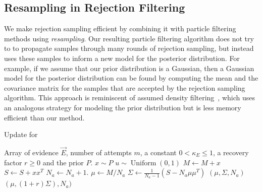 \documentclass[twoside]{article}
\newcommand{\CRej}{\text{rejection filtering}}
\begin{document}

\subsection{Resampling in Rejection Filtering}

We make rejection sampling efficient by combining it with particle
filtering methods using \emph{resampling}.
Our resulting particle filtering algorithm does not try to
to propagate samples through many rounds of rejection sampling, but instead
uses these samples to inform a new model for the posterior distribution. 
For example, if
we assume that our prior distribution is a Gaussian, then a Gaussian model for the posterior
distribution can be found by computing the mean and the covariance matrix for the samples
that are accepted by the rejection sampling algorithm.  This approach is
reminiscent of assumed density filtering~\cite{minka_expectation_2001}, which uses an analogous strategy
for modeling the prior distribution but is less memory efficient than
our method.

\begin{algorithm}[t!]
    \caption{Update for \CRej}
    \label{alg:crej}
    \begin{algorithmic}
        \Require Array of evidence $\vec{E}$, number of attempts $m$, a constant $0<\kappa_E\le 1$, a recovery factor $r \ge 0$ and the prior $P$.
            \State $x \sim P$
            \State $u \sim \operatorname{Uniform}(0, 1)$
            \State $M \gets M+ x$
            \State $S \gets S+ xx^T$
    \State $N_a \gets N_a +1$.
            \EndIf
    \EndFor
       \State $\mu\gets M/N_a $
       \State $\Sigma \gets \frac{1}{N_a -1}\left(S - N_a \mu\mu^T \right)$
    \State\Return $(\mu,\Sigma,N_a)$
   \Else
    \State\Return $(\mu, (1+r)\Sigma),N_a)$

   \EndIf
          
        \EndFunction
    \end{algorithmic}
\end{algorithm}
\end{document}
